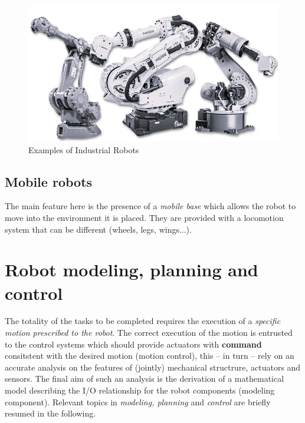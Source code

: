 \begin{figure}
    \centering
    \includegraphics[scale=0.4]{img/3_Industrial_Robots.png}
    \caption{Examples of Industrial Robots}
\end{figure}

\subsection{Mobile robots}
The main feature here is the presence of a \textit{mobile base} which allows the robot to move into the environment it is placed. They are provided with a locomotion system that can be different (wheels, legs, wings...).



\section{Robot modeling, planning and control}
The totality of the tasks to be completed requires the execution of a \textit{specific motion prescribed to the robot}. The correct execution of the motion is entrusted to the control systems which should provide actuators with \textbf{command} consitstent with the desired motion (motion control), this -- in turn -- rely on an accurate analysis on the features of (jointly) mechanical structrure, actuators and sensors. The final aim of such an analysis is the derivation of a mathematical model describing the I/O relationship for the robot components (modeling component). Relevant topics in \textit{modeling, planning} and \textit{control} are briefly resumed in the following. 

